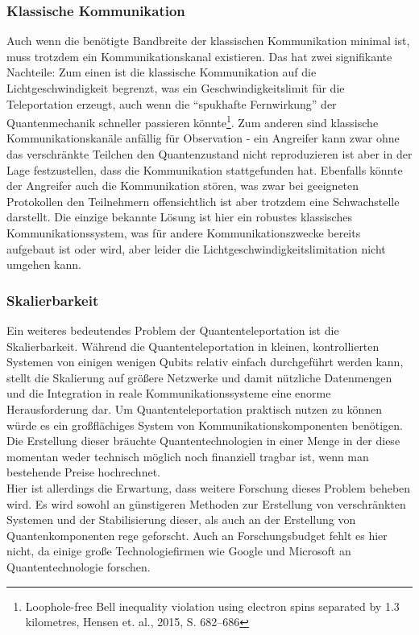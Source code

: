 \subsubsection{Klassische Kommunikation}
Auch wenn die benötigte Bandbreite der klassischen Kommunikation minimal ist, muss trotzdem ein Kommunikationskanal
existieren.
Das hat zwei signifikante Nachteile: Zum einen ist die klassische Kommunikation auf die Lichtgeschwindigkeit begrenzt,
was ein Geschwindigkeitslimit für die Teleportation erzeugt, auch wenn die ``spukhafte Fernwirkung'' der Quantenmechanik
schneller passieren könnte\footnote{Loophole-free Bell inequality violation using electron spins separated by 1.3 kilometres, Hensen et. al., 2015, S. 682--686}.
Zum anderen sind klassische Kommunikationskanäle anfällig für Observation - ein Angreifer kann zwar
ohne das verschränkte Teilchen den Quantenzustand nicht reproduzieren ist aber in der Lage festzustellen, dass die
Kommunikation stattgefunden hat.
Ebenfalls könnte der Angreifer auch die Kommunikation stören, was zwar bei geeigneten Protokollen den Teilnehmern
offensichtlich ist aber trotzdem eine Schwachstelle darstellt.
Die einzige bekannte Lösung ist hier ein robustes klassisches Kommunikationssystem, was für andere Kommunikationszwecke
bereits aufgebaut ist oder wird, aber leider die Lichtgeschwindigkeitslimitation nicht umgehen kann.


\subsubsection{Skalierbarkeit}

Ein weiteres bedeutendes Problem der Quantenteleportation ist die Skalierbarkeit.
Während die Quantenteleportation in kleinen, kontrollierten Systemen von einigen wenigen Qubits relativ einfach durchgeführt werden kann,
stellt die Skalierung auf größere Netzwerke und damit nützliche Datenmengen und die Integration in reale Kommunikationssysteme eine enorme Herausforderung dar.
Um Quantenteleportation praktisch nutzen zu können würde es ein großflächiges System von Kommunikationskomponenten
benötigen.
Die Erstellung dieser bräuchte Quantentechnologien in einer Menge in der diese momentan weder technisch möglich
noch finanziell tragbar ist, wenn man bestehende Preise hochrechnet.\\

Hier ist allerdings die Erwartung, dass weitere Forschung dieses Problem beheben wird.
Es wird sowohl an günstigeren Methoden zur Erstellung von verschränkten Systemen und der Stabilisierung dieser,
als auch an der Erstellung von Quantenkomponenten rege geforscht.
Auch an Forschungsbudget fehlt es hier nicht, da einige große Technologiefirmen wie Google und Microsoft an Quantentechnologie forschen.

